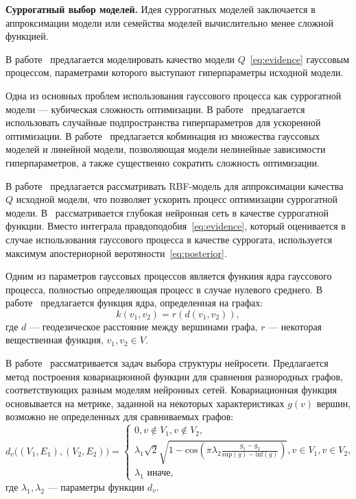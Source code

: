 \textbf{Суррогатный выбор моделей. }
Идея суррогатных моделей заключается в аппроксимации модели или семейства моделей вычислительно менее сложной функцией.

В работе~\cite{bo_gp} предлагается моделировать качество модели $Q$~\eqref{eq:evidence} гауссовым процессом, параметрами которого выступают гиперпараметры исходной модели.

Одна из основных проблем использования гауссового процесса как суррогатной модели --- кубическая сложность оптимизации. В работе~\cite{random_gaus} предлагается использовать случайные подпространства гиперпараметров для ускоренной оптимизации.  В работе~\cite{gp_tree} предлагается кобминация из множества гауссовых моделей и линейной модели, позволяющая модели нелинейные зависимости гиперпараметров, а также существенно сократить сложность оптимизации. 

В работе~\cite{rbf_surrogate} предлагается рассматривать RBF-модель для аппроксимации качества $Q$ исходной модели, что позволяет ускорить процесс оптимизации суррогатной модели. В~\cite{snoek_deep} рассматривается глубокая нейронная сеть в качестве суррогатной функции. Вместо интеграла правдоподобия~\eqref{eq:evidence}, который оценивается в случае использования гауссового процесса в качестве суррогата, используется максимум апостериорной веротяности~\eqref{eq:posterior}.

Одним из параметров гауссовых процессов является функиия ядра гауссового процесса, полностью определяющая процесс в случае нулевого среднего. В работе~\cite{gp_fusion} предлагается функция ядра, определенная на графах:
    \[
    k(v_1,v_2) = r(d(v_1,v_2)),
    \]
где $d$ --- геодезическое расстояние между вершинами графа, $r$ --- некоторая вещественная функция, $v_1, v_2 \in V$.

В работе~\cite{gp_arc} рассматривается задач выбора структуры нейросети. Предлагается метод построения ковариационной функции для сравнения разнородных графов, соответствующих разным моделям нейронных сетей. Ковариационная функция основывается на метрике, заданной на некоторых характеристиках $g(v)$ вершин, возможно не определенных для сравниваемых графов:
\[
    d_v\bigl( (V_1, E_1), (V_2,E_2) \bigr) = \begin{cases}
    0, v \not \in V_1, v \not \in V_2,\\    
    \lambda_1\sqrt{2}\sqrt{1- \text{cos}(\pi\lambda_2\frac{g_1 - g_2}{\text{sup}(g) - \text{inf}(g) })}, v \in V_1, v \in V_2,\\
    \lambda_1 \text{ иначе,}
    \end{cases}
\]
где $\lambda_1, \lambda_2$ --- параметры функции $d_v$.

